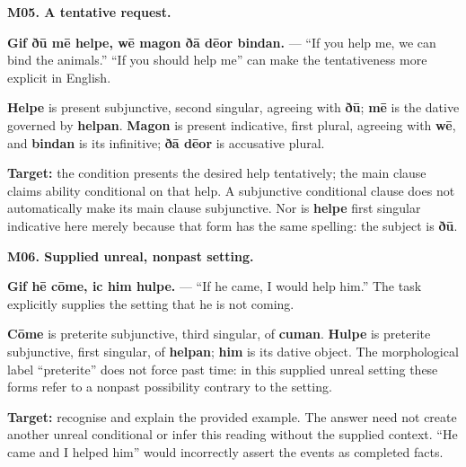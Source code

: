 \par\begin{minipage}{\linewidth}\raggedright
\textbf{M05. A tentative request.}

\textbf{Gif ðū mē helpe, wē magon ðā dēor bindan.} — “If you help me, we can bind the animals.” “If you should help me” can make the tentativeness more explicit in English.

\textbf{Helpe} is present subjunctive, second singular, agreeing with \textbf{ðū}; \textbf{mē} is the dative governed by \textbf{helpan}. \textbf{Magon} is present indicative, first plural, agreeing with \textbf{wē}, and \textbf{bindan} is its infinitive; \textbf{ðā dēor} is accusative plural.

\textbf{Target:} the condition presents the desired help tentatively; the main clause claims ability conditional on that help. A subjunctive conditional clause does not automatically make its main clause subjunctive. Nor is \textbf{helpe} first singular indicative here merely because that form has the same spelling: the subject is \textbf{ðū}.

\end{minipage}\par\addvspace{4pt}

\par\begin{minipage}{\linewidth}\raggedright
\textbf{M06. Supplied unreal, nonpast setting.}

\textbf{Gif hē cōme, ic him hulpe.} — “If he came, I would help him.” The task explicitly supplies the setting that he is not coming.

\textbf{Cōme} is preterite subjunctive, third singular, of \textbf{cuman}. \textbf{Hulpe} is preterite subjunctive, first singular, of \textbf{helpan}; \textbf{him} is its dative object. The morphological label “preterite” does not force past time: in this supplied unreal setting these forms refer to a nonpast possibility contrary to the setting.

\textbf{Target:} recognise and explain the provided example. The answer need not create another unreal conditional or infer this reading without the supplied context. “He came and I helped him” would incorrectly assert the events as completed facts.

\end{minipage}\par\addvspace{4pt}

